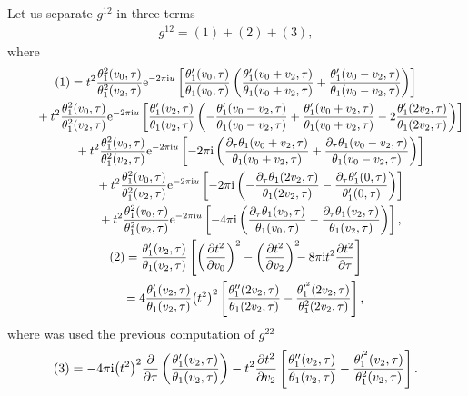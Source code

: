 \documentclass[10pt,a4paper]{amsart}
\numberwithin{equation}{section}
\begin{document}
Let us separate $g^{12}$ in three terms
\begin{gather*}
g^{12}=(1)+(2)+(3),
\end{gather*}
where
\begin{gather*}
(1)=t^2\frac{\theta_1^2(v_0,\tau)}{\theta_1^2(v_2,\tau)}{\rm e}^{-2\pi {\rm i} u}\left[\frac{\theta_1^{\prime}(v_0,\tau)}{\theta_1(v_0,\tau)} \left(\frac{\theta_1^{\prime}(v_0+v_2,\tau)}{\theta_1(v_0+v_2,\tau)} +\frac{\theta_1^{\prime}(v_0-v_2,\tau)}{\theta_1(v_0-v_2,\tau)}\right)\right]
\\ \hphantom{(1)=}
{}+t^2\frac{\theta_1^2(v_0,\tau)}{\theta_1^2(v_2,\tau)}{\rm e}^{-2\pi {\rm i} u}\left[\frac{\theta_1^{\prime}(v_2,\tau)}{\theta_1(v_2,\tau)} \left( - \frac{\theta_1^{\prime}(v_0-v_2,\tau)}{\theta_1(v_0-v_2,\tau)} +\frac{\theta_1^{\prime}(v_0+v_2,\tau)}{\theta_1(v_0+v_2,\tau)} -2\frac{\theta_1^{\prime}(2v_2,\tau)}{\theta_1(2v_2,\tau)}\right)\right]
\\ \hphantom{(1)=}
{}+t^2\frac{\theta_1^2(v_0,\tau)}{\theta_1^2(v_2,\tau)}{\rm e}^{-2\pi {\rm i} u}\left[ - 2\pi {\rm i}\left(\frac{\partial_{\tau}\theta_1(v_0+v_2,\tau)}{\theta_1(v_0+v_2,\tau)} +\frac{\partial_{\tau}\theta_1(v_0-v_2,\tau)}{\theta_1(v_0-v_2,\tau)}\right)\right]
\\ \hphantom{(1)=}
{}+t^2\frac{\theta_1^2(v_0,\tau)}{\theta_1^2(v_2,\tau)}{\rm e}^{-2\pi {\rm i} u}\left[-2\pi {\rm i}\left(-\frac{\partial_{\tau}\theta_1(2v_2,\tau)}{\theta_1(2v_2,\tau)} -\frac{\partial_{\tau}\theta_1^{\prime}(0,\tau)}{\theta_1^{\prime}(0,\tau)}\right)\right]
\\ \hphantom{(1)=}
{}+t^2\frac{\theta_1^2(v_0,\tau)}{\theta_1^2(v_2,\tau)}{\rm e}^{-2\pi {\rm i} u}\left[ - 4\pi {\rm i}\left(\frac{\partial_{\tau}\theta_1(v_0,\tau)}{\theta_1(v_0,\tau)} -\frac{\partial_{\tau}\theta_1(v_2,\tau)}{\theta_1(v_2,\tau)}\right)\right],
\\
(2)=\frac{\theta_1^{\prime}(v_2,\tau)}{\theta_1(v_2,\tau)}
\left[\left(\frac{\partial t^2}{\partial v_0}\right)^2
 - \left(\frac{\partial t^2}{\partial v_2}\right)^2 \!\!\!-8\pi {\rm i}t^2\frac{\partial t^2}{\partial \tau}\right]\\
 \hphantom{(2)}{}
=4\frac{\theta_1^{\prime}(v_2,\tau)}{\theta_1(v_2,\tau)}\big(t^2\big)^2
\left[\frac{\theta_1^{\prime\prime}(2v_2,\tau)}{\theta_1(2v_2,\tau)} -\frac{\theta_1^{\prime^2}(2v_2,\tau)}{\theta_1^2(2v_2,\tau)}\right],
\end{gather*}
where was used the previous computation of $g^{22}$
\begin{gather*}
(3)=-4\pi {\rm i}\big(t^2\big)^2\frac{\partial}{\partial \tau}\left(\frac{\theta_1^{\prime}(v_2,\tau)}{\theta_1(v_2,\tau)}\right)
-t^2\frac{\partial t^2}{\partial v_2}\left[\frac{\theta_1^{\prime\prime}(v_2,\tau)}{\theta_1(v_2,\tau)} -\frac{\theta_1^{\prime^2}(v_2,\tau)}{\theta_1^2(v_2,\tau)}\right].
\end{gather*}
\end{document}
